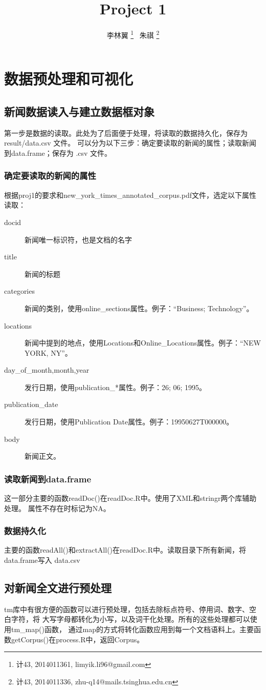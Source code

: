 \documentclass[12pt]{article}
\title{Project 1}
\author{
李林翼 \footnote{计43, 2014011361, limyik.li96@gmail.com}
\ 朱祺 \footnote{计43, 2014011336, zhu-q14@mails.tsinghua.edu.cn}
}
\begin{document}
\maketitle{}
\tableofcontents
\newpage

\section{数据预处理和可视化}
\subsection{新闻数据读入与建立数据框对象}
第一步是数据的读取。此处为了后面便于处理，将读取的数据持久化，保存为 result/data.csv 文件。
可以分为以下三步：确定要读取的新闻的属性；读取新闻到data.frame；保存为 .csv 文件。
\subsubsection{确定要读取的新闻的属性}
根据proj1的要求和new\_york\_times\_annotated\_corpus.pdf文件，选定以下属性读取：
\begin{description}
  \item[docid]
  新闻唯一标识符，也是文档的名字
  \item[title]
  新闻的标题
  \item[categories]
  新闻的类别，使用online\_sections属性。例子：``Business; Technology''。
  \item[locations]
  新闻中提到的地点，使用Locations和Online\_Locations属性。例子：``NEW YORK, NY''。
  \item[day\_of\_month,month,year]
  发行日期，使用publication\_*属性。例子：26; 06; 1995。
  \item[publication\_date]
  发行日期，使用Publication Date属性。例子：19950627T000000。
  \item[body]
  新闻正文。
\end{description}
\subsubsection{读取新闻到data.frame}
这一部分主要的函数readDoc()在readDoc.R中。使用了XML和stringr两个库辅助处理。
属性不存在时标记为NA。
\subsubsection{数据持久化}
主要的函数readAll()和extractAll()在readDoc.R中。读取目录下所有新闻，将data.frame写入
data.csv

\subsection{对新闻全文进行预处理}
tm库中有很方便的函数可以进行预处理，包括去除标点符号、停用词、数字、空白字符，将
大写字母都转化为小写，以及词干化处理。所有的这些处理都可以使用tm\_map()函数，
通过map的方式将转化函数应用到每一个文档语料上。主要函数getCorpus()在process.R中，返回Corpus。
\end{document}
